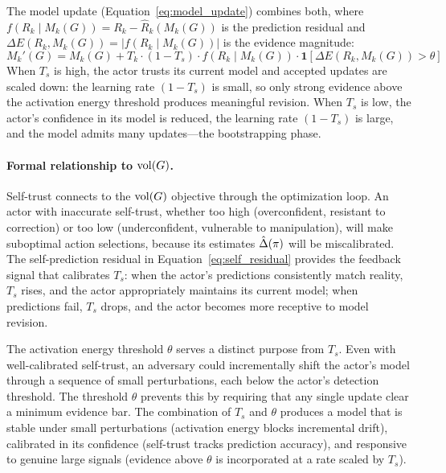 The model update (Equation~\eqref{eq:model_update}) combines both, where
$f(R_k \mid M_k(G)) = R_k - \hat{R}_k(M_k(G))$ is the prediction residual and
$\Delta E(R_k, M_k(G)) = |f(R_k \mid M_k(G))|$ is the evidence magnitude:
\[
M_k'(G) = M_k(G) + T_k \cdot (1 - T_s) \cdot f(R_k \mid M_k(G)) \cdot \mathbf{1}[\Delta E(R_k, M_k(G)) > \theta]
\]
When $T_s$ is high, the actor trusts its current model and accepted updates are scaled down: the learning rate $(1 - T_s)$ is small, so only strong evidence above the activation energy threshold produces meaningful revision. When $T_s$ is low, the actor's confidence in its model is reduced, the learning rate $(1 - T_s)$ is large, and the model admits many updates---the bootstrapping phase.

\paragraph{Formal relationship to $\operatorname{vol}(G)$.} Self-trust connects to the $\operatorname{vol}(G)$ objective through the optimization loop. An actor with inaccurate self-trust, whether too high (overconfident, resistant to correction) or too low (underconfident, vulnerable to manipulation), will make suboptimal action selections, because its estimates $\hat{\Delta}(\pi)$ will be miscalibrated. The self-prediction residual in Equation~\eqref{eq:self_residual} provides the feedback signal that calibrates $T_s$: when the actor's predictions consistently match reality, $T_s$ rises, and the actor appropriately maintains its current model; when predictions fail, $T_s$ drops, and the actor becomes more receptive to model revision.

The activation energy threshold $\theta$ serves a distinct purpose from $T_s$. Even with well-calibrated self-trust, an adversary could incrementally shift the actor's model through a sequence of small perturbations, each below the actor's detection threshold. The threshold $\theta$ prevents this by requiring that any single update clear a minimum evidence bar. The combination of $T_s$ and $\theta$ produces a model that is stable under small perturbations (activation energy blocks incremental drift), calibrated in its confidence (self-trust tracks prediction accuracy), and responsive to genuine large signals (evidence above $\theta$ is incorporated at a rate scaled by $T_s$).


